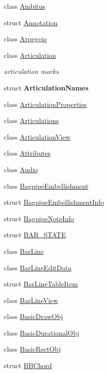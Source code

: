 \begin{DoxyCompactItemize}
\item 
class \hyperlink{class_ms_1_1_ambitus}{Ambitus}
\item 
struct \hyperlink{struct_ms_1_1_annotation}{Annotation}
\item 
class \hyperlink{class_ms_1_1_arpeggio}{Arpeggio}
\item 
class \hyperlink{class_ms_1_1_articulation}{Articulation}
\begin{DoxyCompactList}\small\item\em articulation marks \end{DoxyCompactList}\item 
struct {\bfseries Articulation\+Names}
\item 
class \hyperlink{class_ms_1_1_articulation_properties}{Articulation\+Properties}
\item 
class \hyperlink{class_ms_1_1_articulations}{Articulations}
\item 
class \hyperlink{class_ms_1_1_articulation_view}{Articulation\+View}
\item 
class \hyperlink{class_ms_1_1_attributes}{Attributes}
\item 
class \hyperlink{class_ms_1_1_audio}{Audio}
\item 
class \hyperlink{class_ms_1_1_bagpipe_embellishment}{Bagpipe\+Embellishment}
\item 
struct \hyperlink{struct_ms_1_1_bagpipe_embellishment_info}{Bagpipe\+Embellishment\+Info}
\item 
struct \hyperlink{struct_ms_1_1_bagpipe_note_info}{Bagpipe\+Note\+Info}
\item 
struct \hyperlink{struct_ms_1_1_b_a_r___s_t_a_t_e}{B\+A\+R\+\_\+\+S\+T\+A\+TE}
\item 
class \hyperlink{class_ms_1_1_bar_line}{Bar\+Line}
\item 
class \hyperlink{class_ms_1_1_bar_line_edit_data}{Bar\+Line\+Edit\+Data}
\item 
struct \hyperlink{struct_ms_1_1_bar_line_table_item}{Bar\+Line\+Table\+Item}
\item 
class \hyperlink{class_ms_1_1_bar_line_view}{Bar\+Line\+View}
\item 
class \hyperlink{class_ms_1_1_basic_draw_obj}{Basic\+Draw\+Obj}
\item 
class \hyperlink{class_ms_1_1_basic_durational_obj}{Basic\+Durational\+Obj}
\item 
class \hyperlink{class_ms_1_1_basic_rect_obj}{Basic\+Rect\+Obj}
\item 
struct \hyperlink{struct_ms_1_1_b_b_chord}{B\+B\+Chord}

\end{DoxyCompactItemize}
